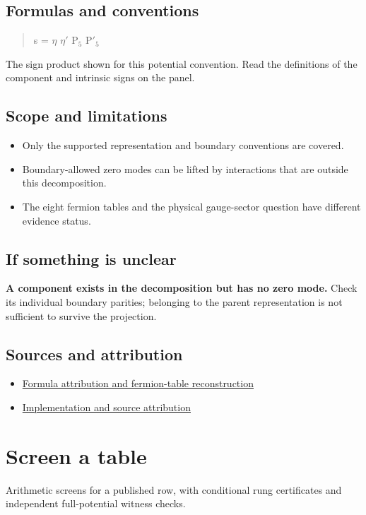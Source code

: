 \documentclass[11pt,a4paper]{article}
\begin{document}
\subsection*{Formulas and conventions}
\begin{quote}s = \ensuremath{\eta} \ensuremath{\eta}\ensuremath{\prime} P\ensuremath{{}_{5}} P\ensuremath{\prime}\ensuremath{{}_{5}}\end{quote}
The sign product shown for this potential convention. Read the definitions of the component and intrinsic signs on the panel.

\subsection*{Scope and limitations}
\begin{itemize}
\item Only the supported representation and boundary conventions are covered.
\item Boundary-allowed zero modes can be lifted by interactions that are outside this decomposition.
\item The eight fermion tables and the physical gauge-sector question have different evidence status.
\end{itemize}
\subsection*{If something is unclear}
\textbf{A component exists in the decomposition but has no zero mode.} Check its individual boundary parities; belonging to the parent representation is not sufficient to survive the projection.

\subsection*{Sources and attribution}
\begin{itemize}
\item \href{https://karlesmarin.github.io/ghu-explorer/docs/su7-certification.html}{Formula attribution and fermion-table reconstruction}
\item \href{https://github.com/karlesmarin/ghu-lab/blob/main/src/sections/multiplets_section.js}{Implementation and source attribution}
\end{itemize}
\section{Screen a table}
Arithmetic screens for a published row, with conditional rung certificates and independent full-potential witness checks.
\end{document}
